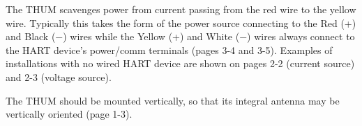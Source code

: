 \vskip 10pt

The THUM scavenges power from current passing from the red wire to the yellow wire.  Typically this takes the form of the power source connecting to the Red (+) and Black ($-$) wires while the Yellow (+) and White ($-$) wires always connect to the HART device's power/comm terminals (pages 3-4 and 3-5).  Examples of installations with no wired HART device are shown on pages 2-2 (current source) and 2-3 (voltage source).

\vskip 10pt

The THUM should be mounted vertically, so that its integral antenna may be vertically oriented (page 1-3).



